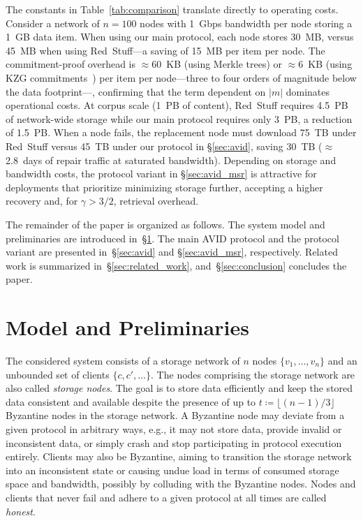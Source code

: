 \documentclass[sigconf,screen]{acmart}
\begin{document}
The constants in Table~\ref{tab:comparison} translate directly to operating costs.
Consider a network of $n=100$ nodes with 1~Gbps bandwidth per node storing a 1~GB data item.
When using our main protocol, each node stores 30~MB, versus 45~MB when using Red~Stuff---a saving of 15~MB per item per node.
The commitment-proof overhead is $\approx$60~KB (using Merkle trees) or $\approx$6~KB (using KZG commitments~\cite{kate2010}) per item per node---three to four orders of magnitude below the data footprint---, confirming that the term dependent on $|m|$ dominates operational costs.
At corpus scale (1~PB of content), Red~Stuff requires 4.5~PB of network-wide storage while our main protocol requires only 3~PB, a reduction of 1.5~PB.
When a node fails, the replacement node must download 75~TB under Red~Stuff versus 45~TB under our protocol in  \S\ref{sec:avid}, saving 30~TB ($\approx$2.8~days of repair traffic at saturated bandwidth).
Depending on storage and bandwidth costs, the protocol variant in \S\ref{sec:avid_msr} is attractive for deployments that prioritize minimizing storage further, accepting a higher recovery and, for $\gamma > 3/2$, retrieval overhead.

The remainder of the paper is organized as follows. The system model and preliminaries are introduced in~\S\ref{sec:model}. The main AVID protocol and the protocol variant are presented in~\S\ref{sec:avid} and \S\ref{sec:avid_msr}, respectively. Related work is summarized in~\S\ref{sec:related_work}, and~\S\ref{sec:conclusion} concludes the paper.


\section{Model and Preliminaries}
\label{sec:model}

The considered system consists of a storage network of $n$ nodes $\{v_1, \ldots , v_n\}$ and an unbounded set of clients $\{c, c', \ldots \}$. The nodes comprising the storage network are also called \emph{storage nodes}.
The goal is to store data efficiently and keep the stored data consistent and available despite the presence of up to $t \coloneqq \lfloor (n-1)/3\rfloor$ Byzantine nodes in the storage network. A Byzantine node may deviate from a given protocol in arbitrary ways, e.g., it may not store data, provide invalid or inconsistent data, or simply crash and stop participating in protocol execution entirely.
Clients may also be Byzantine, aiming to transition the storage network into an inconsistent state or causing undue load in terms of consumed storage space and bandwidth, possibly by colluding with the Byzantine nodes.
Nodes and clients that never fail and adhere to a given protocol at all times are called \emph{honest}.
\end{document}
